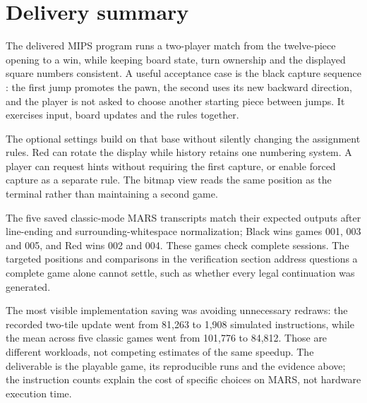 \section{Delivery summary}
\label{sec:conclusion}
The delivered MIPS program runs a two-player match from the twelve-piece opening to a win, while keeping board state, turn ownership and the displayed square numbers consistent. A useful acceptance case is the black capture sequence : the first jump promotes the pawn, the second uses its new backward direction, and the player is not asked to choose another starting piece between jumps. It exercises input, board updates and the rules together.

The optional settings build on that base without silently changing the assignment rules. Red can rotate the display while history retains one numbering system. A player can request hints without requiring the first capture, or enable forced capture as a separate rule. The bitmap view reads the same position as the terminal rather than maintaining a second game.

The five saved classic-mode MARS transcripts match their expected outputs after line-ending and surrounding-whitespace normalization; Black wins games 001, 003 and 005, and Red wins 002 and 004. These games check complete sessions. The targeted positions and comparisons in the verification section address questions a complete game alone cannot settle, such as whether every legal continuation was generated.

The most visible implementation saving was avoiding unnecessary redraws: the recorded two-tile update went from 81,263 to 1,908 simulated instructions, while the mean across five classic games went from 101,776 to 84,812. Those are different workloads, not competing estimates of the same speedup. The deliverable is the playable game, its reproducible runs and the evidence above; the instruction counts explain the cost of specific choices on MARS, not hardware execution time.
